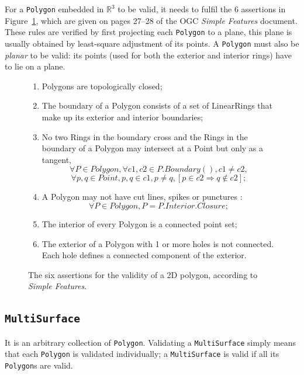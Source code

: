 For a \texttt{Polygon} embedded in $\mathbb{R}^3$ to be valid, it needs to fulfil the 6 assertions in Figure~\ref{fig:ogcsf_definitions}, which are given on pages 27--28 of the OGC \emph{Simple Features} document.
These rules are verified by first projecting each \texttt{Polygon} to a plane, this plane is usually obtained by least-square adjustment of its points.
A \texttt{Polygon} must also be \emph{planar} to be valid: its points (used for both the exterior and interior rings) have to lie on a plane.
\begin{figure}
  \centering
  \begin{boxedminipage}{\textwidth}
    {\small
  \begin{enumerate}
    \item Polygons are topologically closed;
    \item The boundary of a Polygon consists of a set of LinearRings that make up its exterior and interior boundaries;
    \item No two Rings in the boundary cross and the Rings in the boundary of a Polygon may intersect at a Point but only as a tangent, \eg\
      \[
         \forall P \in Polygon, \forall c1, c2 \in P.Boundary(), c1 \neq c2,
      \]
      \[
          \forall p, q \in Point, p, q \in c1, p \neq q, [p \in c2 \Rightarrow q \notin c2];
      \]
    \item A Polygon may not have cut lines, spikes or punctures \eg:
      \[
         \forall P \in Polygon, P = P.Interior.Closure;
      \]
    \item The interior of every Polygon is a connected point set;
    \item The exterior of a Polygon with 1 or more holes is not connected. Each hole defines a connected component of the exterior.
  \end{enumerate}
  }
  \end{boxedminipage}
\caption[Assertions for the validity of a 2D polygon]{The six assertions for the validity of a 2D polygon, according to \emph{Simple Features}.}%
\label{fig:ogcsf_definitions}
\end{figure}



\subsection{\texttt{MultiSurface}}
It is an arbitrary collection of \texttt{Polygon}.
Validating a \texttt{MultiSurface} simply means that each \texttt{Polygon} is validated individually; a \texttt{MultiSurface} is valid if all its \texttt{Polygon}s are valid.


